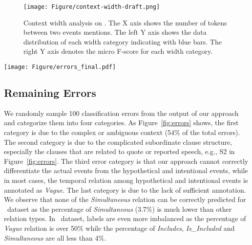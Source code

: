 \begin{figure}[h!]
    \centering
    \texttt{[image: Figure/context-width-draft.png]}
\caption{Context width analysis on \tbd. The X axis shows the number of tokens between two events mentions. The left Y axis shows the data distribution of each width category indicating with blue bars. The right Y axis denotes the micro F-score for each width category.}\label{fig:context width}
\end{figure}

\begin{figure*}[]
    \centering
    \texttt{[image: Figure/errors\_final.pdf]}
\caption{Types of remaining errors}
\label{fig:errors}
\end{figure*}




\subsection{Remaining Errors}

We randomly sample 100 classification errors from the output of our approach and categorize them into four categories. As Figure~\ref{fig:errors} shows, the first category is due to the complex or ambiguous context (54\% of the total errors). The second category is due to the complicated subordinate clause structure, especially the clauses that are related to quote or reported speech, e.g., S2 in Figure~\ref{fig:errors}. The third error category is that our approach cannot correctly differentiate the actual events from the hypothetical and intentional events, while in most cases, the temporal relation among hypothetical and intentional events is annotated as \textit{Vague}. The last category is due to the lack of sufficient annotation. We observe that none of the \textit{Simultaneous} relation can be correctly predicted for \matres~dataset as the percentage of \textit{Simultaneous} (3.7\%) is much lower than other relation types. In \tbd~dataset, labels are even more imbalanced as the percentage of \textit{Vague} relation is over 50\% while the percentage of \textit{Includes}, \textit{Is\_Included} and \textit{Simultaneous} are all less than 4\%.  













%
